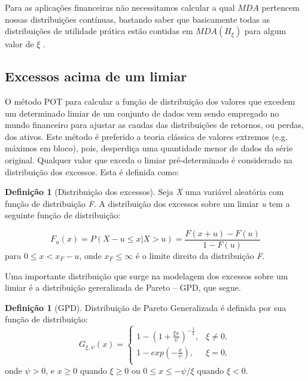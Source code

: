 \documentclass[1p]{elsarticle}
\theoremstyle{definition}
\newtheorem{defi}[teor]{Definição}
\begin{document}
Para as aplicações financeiras não necessitamos calcular a qual $MDA$ pertencem nossas distribuições contínuas, bastando saber que basicamente todas as distribuições de utilidade prática estão contidas em $MDA(H_\xi)$ para algum valor de $\xi$ \cite[p. ~139]{McNeil2015}.

\subsection{Excessos acima de um limiar}
\label{sec:excess}

O método POT para calcular a função de distribuição dos valores que excedem um determinado limiar de um conjunto de dados vem sendo empregado no mundo financeiro para ajustar as caudas das distribuições de retornos, ou perdas, dos ativos. Este método é preferido a teoria clássica de valores extremos (e.g. máximos em bloco), pois, desperdiça uma quantidade menor de dados da série original. Qualquer valor que exceda o limiar pré-determinado é considerado na distribuição dos excessos. Esta é definida como:

\begin{defi}[Distribuição dos excessos] \label{defi:excess}
	Seja \emph{X} uma variável aleatória com função de distribuição \emph{F}. A distribuição dos excessos sobre um limiar \emph{u} tem a seguinte função de distribuição:
	
	\begin{equation}
	\label{eq:excessdist}
	F_u(x)=P(X-u \leq x | X > u)=\frac{F(x+u)-F(u)}{1-F(u)}
	\end{equation}
	para $0 \leq x < x_F-u$, onde $x_F \leq \infty$ é o limite direito da distribuição \emph{F}.
\end{defi}

Uma importante distribuição que surge na modelagem dos excessos sobre um limiar é a distribuição gereralizada de Pareto – GPD, que segue.

\begin{defi}[GPD] \label{defi:GPD}
	Distribuição de Pareto Generalizada é definida por sua função de distribuição:
	\begin{equation}
	\label{eq:GPD}
	G_{\xi,\psi}(x) = 
	\begin{cases}
	1- \left(1+ \frac{\xi x}{\psi} \right)^{-\frac{1}{\xi}}, & \xi \neq 0,\\
	1-exp\left(-\frac{x}{\psi}\right), & \xi = 0,\\
	\end{cases}
	\end{equation}
	onde $\psi > 0$, e $x\geq 0$ quando $\xi  \geq 0$ ou $0 \leq x \leq -\psi / \xi$ quando $\xi < 0$.
\end{defi}
\end{document}
